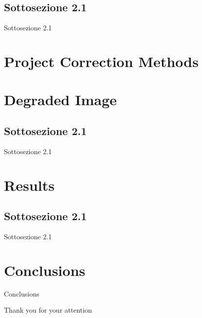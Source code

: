 \documentclass[11pt]{beamer}
\begin{document}
\subsection{Sottosezione 2.1}
\begin{frame}{Sottosezione 2.1}
\end{frame}

\section{Project Correction Methods}




\section{Degraded Image}
\subsection{Sottosezione 2.1}
\begin{frame}{Sottosezione 2.1}
\end{frame}

\section{Results}
\subsection{Sottosezione 2.1}
\begin{frame}{Sottosezione 2.1}
\end{frame}

\section{Conclusions}
\begin{frame}{Conclusions}
\end{frame}

\begin{frame}
  \centering
  {\Huge Thank you for your attention}
\end{frame}
\end{document}
